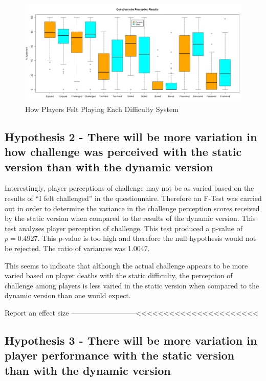 \documentclass[journal]{IEEEtran}
\begin{document}
\begin{figure}[h]
	\includegraphics[width=1.0\linewidth]{questionnaireboxplot.jpg}
	\caption{How Players Felt Playing Each Difficulty System}
	\label{fig::6}
\end{figure} 



\subsection{Hypothesis 2 - There will be more variation in how challenge was perceived with the static version than with the dynamic version}

Interestingly, player perceptions of challenge may not be as varied based on the results of ``I felt challenged'' in the questionnaire. Therefore an F-Test was carried out in order to determine the variance in the challenge perception scores received by the static version when compared to the results of the dynamic version. This test analyses player perception of challenge. This test produced a p-value of $p = 0.4927$. This p-value is too high and therefore the null hypothesis would not be rejected. The ratio of variances was 1.0047.

This seems to indicate that although the actual challenge appears to be more varied based on player deaths with the static difficulty, the perception of challenge among players is less varied in the static version when compared to the dynamic  version than one would expect.

Report an effect size ---------------------------<<<<<<<<<<<<<<<<<<<<<<

\subsection{Hypothesis 3 - There will be more variation in player performance with the static version than with the dynamic version}
\end{document}
